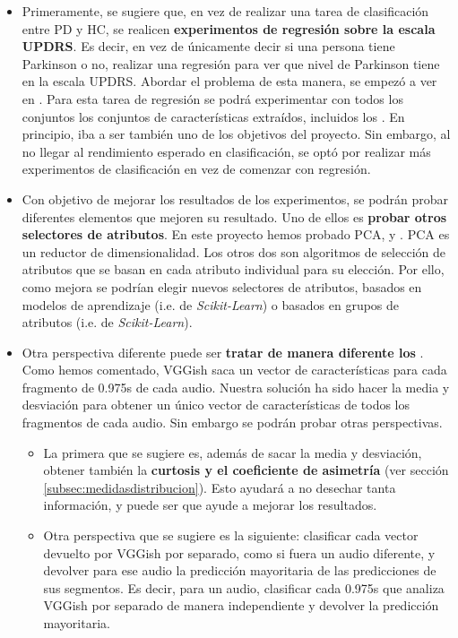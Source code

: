 \begin{itemize}
\item Primeramente, se sugiere que, en vez de realizar una tarea de clasificación entre PD y HC, se realicen \textbf{experimentos de regresión sobre la escala UPDRS}. Es decir, en vez de únicamente decir si una persona tiene Parkinson o no, realizar una regresión para ver que nivel de Parkinson tiene en la escala UPDRS. Abordar el problema de esta manera, se empezó a ver en \cite{MxLtAccurate}. Para esta tarea de regresión se podrá experimentar con todos los conjuntos los conjuntos de características extraídos, incluidos los . En principio, iba a ser también uno de los objetivos del proyecto. Sin embargo, al no llegar al rendimiento esperado en clasificación, se optó por realizar más experimentos de clasificación en vez de comenzar con regresión.
\item Con objetivo de mejorar los resultados de los experimentos, se podrán probar diferentes elementos que mejoren su resultado. Uno de ellos es \textbf{probar otros selectores de atributos}. En este proyecto hemos probado PCA,  y . PCA es un reductor de dimensionalidad. Los otros dos son algoritmos de selección de atributos que se basan en cada atributo individual para su elección. Por ello, como mejora se podrían elegir nuevos selectores de atributos, basados en modelos de aprendizaje (i.e.  de \textit{Scikit-Learn}) o basados en grupos de atributos (i.e.  de \textit{Scikit-Learn}).
\item Otra perspectiva diferente puede ser \textbf{tratar de manera diferente los }. Como hemos comentado, VGGish saca un vector de características para cada fragmento de 0.975s de cada audio. Nuestra solución ha sido hacer la media y desviación para obtener un único vector de características de todos los fragmentos de cada audio. Sin embargo se podrán probar otras perspectivas.
	\begin{itemize}
	\item La primera que se sugiere es, además de sacar la media y desviación, obtener también la \textbf{curtosis y el coeficiente de asimetría} (ver sección \ref{subsec:medidasdistribucion}). Esto ayudará a no desechar tanta información, y puede ser que ayude a mejorar los resultados.
	\item Otra perspectiva que se sugiere es la siguiente: clasificar cada vector devuelto por VGGish por separado, como si fuera un audio diferente, y devolver para ese audio la predicción mayoritaria de las predicciones de sus segmentos. Es decir, para un audio, clasificar cada 0.975s que analiza VGGish por separado de manera independiente y devolver la predicción mayoritaria.

\end{itemize}
\end{itemize}
